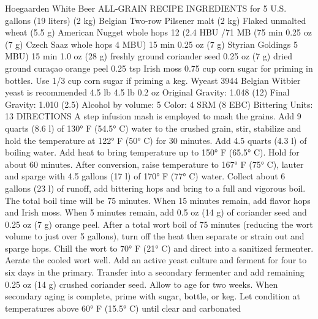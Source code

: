 \documentclass[a4paper,parskip=half]{scrartcl}
\begin{document}
Hoegaarden White Beer
ALL-GRAIN RECIPE
INGREDIENTS
for 5 U.S. gallons (19 liters)
(2 kg) Belgian Two-row Pilsener malt
(2 kg) Flaked unmalted wheat
(5.5 g) American Nugget whole hops 12%
(2.4 HBU /71 MB (75 min
0.25 oz
(7 g) Czech Saaz whole hops 4%
MBU) 15 min
0.25 oz
(7 g) Styrian Goldings 5%
MBU) 15 min
1.0 oz
(28 g) freshly ground coriander seed
0.25 oz
(7 g) dried ground curaçao orange peel
0.25 tsp
Irish moss
0.75 cup
corn sugar for priming in bottles.
Use 1/3 cup corn sugar if priming a keg.
Wyeast 3944 Belgian Witbier yeast is recommended
4.5 lb
4.5 lb
0.2 oz
Original Gravity: 1.048 (12)
Final Gravity: 1.010 (2.5)
Alcohol by volume: 5%
Color: 4 SRM (8 EBC)
Bittering Units: 13
DIRECTIONS
A step infusion mash is employed to mash the grains. Add 9 quarts
(8.6 l) of 130° F (54.5° C) water to the crushed grain, stir, stabilize
and hold the temperature at 122° F (50° C) for 30 minutes. Add 4.5
quarts (4.3 l) of boiling water. Add heat to bring temperature up to
150° F (65.5° C). Hold for about 60 minutes.
After conversion, raise temperature to 167° F (75° C), lauter and
sparge with 4.5 gallons (17 l) of 170° F (77° C) water. Collect about
6 gallons (23 l) of runoff, add bittering hops and bring to a full and
vigorous boil.
The total boil time will be 75 minutes. When 15 minutes remain, add
flavor hops and Irish moss. When 5 minutes remain, add 0.5 oz (14
g) of coriander seed and 0.25 oz (7 g) orange peel. After a total wort
boil of 75 minutes (reducing the wort volume to just over 5 gallons),
turn off the heat then separate or strain out and sparge hops. Chill
the wort to 70° F (21° C) and direct into a sanitized fermenter. Aerate
the cooled wort well. Add an active yeast culture and ferment for
four to six days in the primary. Transfer into a secondary fermenter
and add remaining 0.25 oz (14 g) crushed coriander seed. Allow to
age for two weeks.
When secondary aging is complete, prime with sugar, bottle, or keg.
Let condition at temperatures above 60° F (15.5° C) until clear and
carbonated

\parencite[54]{Papazian2011}
\end{document}

